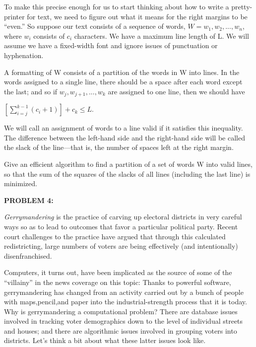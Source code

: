 \documentclass[11pt]{article}
\begin{document}
\vspace{2mm}

To make this precise enough for us to start thinking about how to write a pretty-printer for text, we need to figure out what it means for the right margins to be ``even.'' So suppose our text consists of a sequence of words, $W={w_1,w_2,...,w_n}$, where $w_i$ consists of $c_i$ characters. We have a maximum line length of L. We will assume we have a fixed-width font and ignore issues of punctuation or hyphenation. 

A formatting of W consists of a partition of the words in W into lines. In the words assigned to a single line, there should be a space after each word except the last; and so if $w_j, w_{j+1}, ..., w_k$ are assigned to one line, then we should have 

\centerline{ $\displaystyle[\sum_{i = j}^{k - 1} (c_i + 1)] + c_k \le L.$
}

\noindent We will call an assignment of words to a line valid if it satisfies this inequality. The difference between the left-hand side and the right-hand side will be called the slack of the line—that is, the number of spaces left at the right margin. 

Give an efficient algorithm to find a partition of a set of words W into valid lines, so that the sum of the squares of the slacks of all lines (including the last line) is minimized.

\vspace{6mm}

\noindent \textbf{PROBLEM 4:} 

\vspace{2mm}

\emph{Gerrymandering} is the practice of carving up electoral districts in very careful ways so as to lead to outcomes that favor a particular political party. Recent court challenges to the practice have argued that through this calculated redistricting, large numbers of voters are being effectively (and intentionally) disenfranchised. 

Computers, it turns out, have been implicated as the source of some of the ``villainy'' in the news coverage on this topic: Thanks to powerful software, gerrymandering has changed from an activity carried out by a bunch of people with maps,pencil,and paper into the industrial-strength process that it is today. Why is gerrymandering a computational problem? There are database issues involved in tracking voter demographics down to the level of individual streets and houses; and there are algorithmic issues involved in grouping voters into districts. Let's think a bit about what these latter issues look like. 
\end{document}
